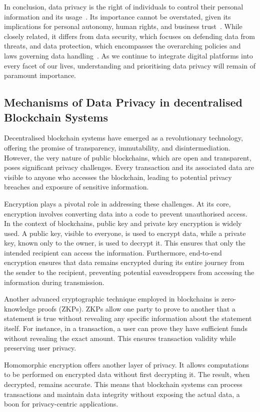 In conclusion, data privacy is the right of individuals to control their personal information and its usage~\cite{Covert.2020}. Its importance cannot be overstated, given its implications for personal autonomy, human rights, and business trust~\cite{Li.2019}. While closely related, it differs from data security, which focuses on defending data from threats, and data protection, which encompasses the overarching policies and laws governing data handling~\cite{Covert.2020}. As we continue to integrate digital platforms into every facet of our lives, understanding and prioritising data privacy will remain of paramount importance.

\subsection{Mechanisms of Data Privacy in decentralised Blockchain Systems}
Decentralised blockchain systems have emerged as a revolutionary technology, offering the promise of transparency, immutability, and disintermediation. However, the very nature of public blockchains, which are open and transparent, poses significant privacy challenges. Every transaction and its associated data are visible to anyone who accesses the blockchain, leading to potential privacy breaches and exposure of sensitive information.

Encryption plays a pivotal role in addressing these challenges. At its core, encryption involves converting data into a code to prevent unauthorised access. In the context of blockchains, public key and private key encryption is widely used. A public key, visible to everyone, is used to encrypt data, while a private key, known only to the owner, is used to decrypt it. This ensures that only the intended recipient can access the information. Furthermore, end-to-end encryption ensures that data remains encrypted during its entire journey from the sender to the recipient, preventing potential eavesdroppers from accessing the information during transmission.

Another advanced cryptographic technique employed in blockchains is zero-knowledge proofs (ZKPs). ZKPs allow one party to prove to another that a statement is true without revealing any specific information about the statement itself. For instance, in a transaction, a user can prove they have sufficient funds without revealing the exact amount. This ensures transaction validity while preserving user privacy.

Homomorphic encryption offers another layer of privacy. It allows computations to be performed on encrypted data without first decrypting it. The result, when decrypted, remains accurate. This means that blockchain systems can process transactions and maintain data integrity without exposing the actual data, a boon for privacy-centric applications.

